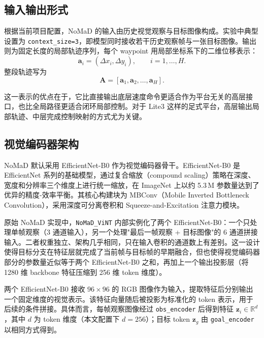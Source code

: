 \subsection{输入输出形式}

根据当前项目配置，NoMaD 的输入由历史视觉观察与目标图像构成。实验中典型设置为 \texttt{context\_size=3}，即模型同时接收若干历史观察帧与一张目标图像。输出则为固定长度的局部轨迹序列，每个 waypoint 用局部坐标系下的二维位移表示：
\begin{equation}
\mathbf{a}_i = (\Delta x_i, \Delta y_i), \qquad i=1,\ldots,H.
\end{equation}
整段轨迹写为
\begin{equation}
\mathbf{A} = [\mathbf{a}_1,\mathbf{a}_2,\ldots,\mathbf{a}_H].
\end{equation}

这一表示的优点在于，它比直接输出底层速度命令更适合作为平台无关的高层接口，也比全局路径更适合闭环局部控制。对于 Lite3 这样的足式平台，高层输出局部轨迹、中层完成控制映射的方式尤为关键。

\subsection{视觉编码器架构}

NoMaD 默认采用 EfficientNet-B0 作为视觉编码器骨干\cite{efficientnet2019}。EfficientNet-B0 是 EfficientNet 系列的基础模型，通过复合缩放（compound scaling）策略在深度、宽度和分辨率三个维度上进行统一缩放，在 ImageNet 上以约 5.3\,M 参数量达到了优异的精度-效率平衡。其核心构建块为 MBConv（Mobile Inverted Bottleneck Convolution），采用深度可分离卷积和 Squeeze-and-Excitation 注意力模块。

原始 NoMaD 实现中，\texttt{NoMaD\_ViNT} 内部实例化了两个 EfficientNet-B0：一个只处理单帧观察（3 通道输入），另一个处理"最后一帧观察 + 目标图像"的 6 通道拼接输入。二者权重独立、架构几乎相同，只在输入卷积的通道数上有差别。这一设计使得目标分支在特征层就完成了当前帧与目标帧的早期融合，但也使得视觉编码器部分的参数量近似等于两个 EfficientNet-B0 之和，再加上一个输出投影层（将 1280 维 backbone 特征压缩到 256 维 token 维度）。

两个 EfficientNet-B0 接收 $96 \times 96$ 的 RGB 图像作为输入，提取特征后分别输出一个固定维度的视觉表示。该特征向量随后被投影为标准化的 token 表示，用于后续的条件拼接。具体而言，每帧观察图像经过 \texttt{obs\_encoder} 后得到特征 $\mathbf{z}_i \in \mathbb{R}^d$，其中 $d$ 为 token 维度（本文配置下 $d=256$）；目标 token $\mathbf{z}_g$ 由 \texttt{goal\_encoder} 以相同方式得到。


